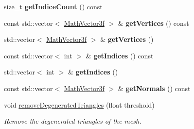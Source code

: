 \begin{DoxyCompactItemize}
size\+\_\+t {\bfseries get\+Indice\+Count} () const
\item 
\mbox{\label{classvisilib_1_1_helper_triangle_mesh_a844573f90ac6a5e9736b35e0f4c6557a}} 
const std\+::vector$<$ \mbox{\hyperlink{classvisilib_1_1_math_vector3__}{Math\+Vector3f}} $>$ \& {\bfseries get\+Vertices} () const
\item 
\mbox{\label{classvisilib_1_1_helper_triangle_mesh_a538dbc1f6eecc2bcf3f9cd97b8250c38}} 
std\+::vector$<$ \mbox{\hyperlink{classvisilib_1_1_math_vector3__}{Math\+Vector3f}} $>$ \& {\bfseries get\+Vertices} ()
\item 
\mbox{\label{classvisilib_1_1_helper_triangle_mesh_af266f76c4ae064fd4bfb4ad47c625be1}} 
const std\+::vector$<$ int $>$ \& {\bfseries get\+Indices} () const
\item 
\mbox{\label{classvisilib_1_1_helper_triangle_mesh_a79b146ef5b498cf060be2c8e41f378a9}} 
std\+::vector$<$ int $>$ \& {\bfseries get\+Indices} ()
\item 
\mbox{\label{classvisilib_1_1_helper_triangle_mesh_afe4ecc25499230d0e913675c56e84524}} 
const std\+::vector$<$ \mbox{\hyperlink{classvisilib_1_1_math_vector3__}{Math\+Vector3f}} $>$ \& {\bfseries get\+Normals} () const
\item 
void \mbox{\hyperlink{classvisilib_1_1_helper_triangle_mesh_a8e1d36896b60a29eded64c1cc28c00cc}{remove\+Degenerated\+Triangles}} (float threshold)
\begin{DoxyCompactList}\small\item\em Remove the degenerated triangles of the mesh. \end{DoxyCompactList}\end{DoxyCompactItemize}
